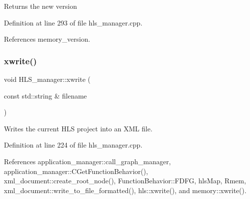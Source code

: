 \begin{DoxyReturn}{Returns}
the new version 
\end{DoxyReturn}


Definition at line 293 of file hls\+\_\+manager.\+cpp.



References memory\+\_\+version.

\mbox{\label{classHLS__manager_adc098d176fadc4a0fb07eeb325022b6d}} 
\subsubsection{\texorpdfstring{xwrite()}{xwrite()}}
{\footnotesize\ttfamily void H\+L\+S\+\_\+manager\+::xwrite (\begin{DoxyParamCaption}\item[{const std\+::string \&}]{filename }\end{DoxyParamCaption})}



Writes the current H\+LS project into an X\+ML file. 



Definition at line 224 of file hls\+\_\+manager.\+cpp.



References application\+\_\+manager\+::call\+\_\+graph\+\_\+manager, application\+\_\+manager\+::\+C\+Get\+Function\+Behavior(), xml\+\_\+document\+::create\+\_\+root\+\_\+node(), Function\+Behavior\+::\+F\+D\+FG, hls\+Map, Rmem, xml\+\_\+document\+::write\+\_\+to\+\_\+file\+\_\+formatted(), hls\+::xwrite(), and memory\+::xwrite().


